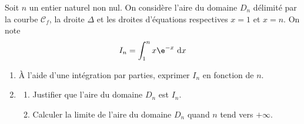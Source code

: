 \medskip

	Soit $n$ un entier naturel non nul. On considère l'aire du domaine $D_{n}$ délimité par la courbe $\mathcal{C}_{f}$, la droite $\Delta$ et les droites d'équations respectives $x=1$ et $x=n$. On note
		\[	I_{n}=\int_{1}^{n} x \e^{-x} \mathrm{~d} x	\]

	\begin{enumerate}
	\item À l'aide d'une intégration par parties, exprimer $I_{n}$ en fonction de $n$.
	\item \begin{enumerate}
		\item Justifier que l'aire du domaine $D_{n}$ est $I_{n}$.

		\item Calculer la limite de l'aire du domaine $D_{n}$ quand $n$ tend vers $+\infty$.
	\end{enumerate}
	\end{enumerate}
